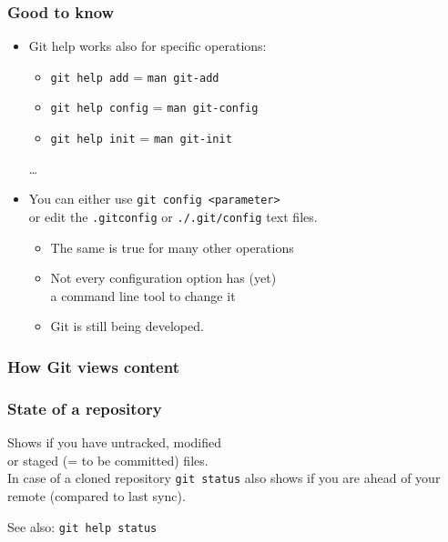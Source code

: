 \documentclass[handout,notes]{gittalk}
\newcommand{\hlcommand}[1]{ %
\colorbox{base3}{\small \texttt{#1}}
}
\begin{document}
\begin{frame}
\frametitle{Good to know}
\begin{itemize}
  \item Git help works also for specific operations:
  \begin{itemize}
    \item \hlcommand{git help add} = \hlcommand{man git-add}
    \item \hlcommand{git help config} = \hlcommand{man git-config}
    \item \hlcommand{git help init} = \hlcommand{man git-init}
  \end{itemize}
  \qquad \dots
  \item You can either use \hlcommand{git config <parameter>}\\
        or edit the \hlcommand{.gitconfig} or \hlcommand{./.git/config} text files.\\
        \begin{itemize}
        \item The same is true for many other operations
        \item Not every configuration option has (yet)\\
        a command line tool to change it
        \item Git is still being developed.
        \end{itemize}
\end{itemize}
\end{frame}


\begin{frame}
\frametitle{How Git views content}
\begin{center}
        
\end{center}
\end{frame}

\begin{frame}
\frametitle{State of a repository}
\begin{tcolorbox}[title=git status]
Shows if you have untracked, modified\\ or staged (= to be committed)
files.\\[0.5em]
In case of a cloned repository \hlcommand{git status} also shows if you are
ahead of your remote (compared to last sync).
\end{tcolorbox}
\vspace*{0.5em}
See also: \hlcommand{git help status}
\end{frame}
\end{document}
